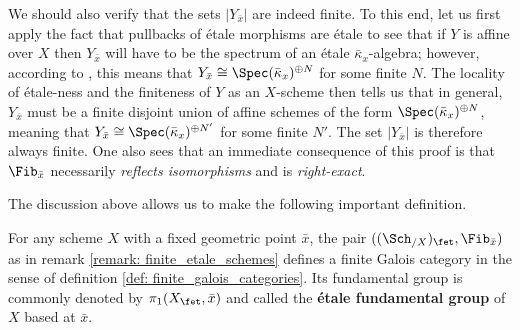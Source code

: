 \begin{remark}
                We should also verify that the sets $|Y_{\bar{x}}|$ are indeed finite. To this end, let us first apply the fact that pullbacks of \'etale morphisms are \'etale to see that if $Y$ is affine over $X$ then $Y_{\bar{x}}$ will have to be the spectrum of an \'etale $\bar{\kappa}_x$-algebra; however, according to \cite[\href{https://stacks.math.columbia.edu/tag/00U3}{Tag 00U3}]{stacks}, this means that $Y_{\bar{x}} \cong \Spec (\bar{\kappa}_x)^{\oplus N}$ for some finite $N$. The locality of \'etale-ness and the finiteness of $Y$ as an $X$-scheme then tells us that in general, $Y_{\bar{x}}$ must be a finite disjoint union of affine schemes of the form $\Spec (\bar{\kappa}_x)^{\oplus N}$, meaning that $Y_{\bar{x}} \cong \Spec (\bar{\kappa}_x)^{\oplus N'}$ for some finite $N'$. The set $|Y_{\bar{x}}|$ is therefore always finite. One also sees that an immediate consequence of this proof is that $\Fib_{\bar{x}}$ necessarily \textit{reflects isomorphisms} and is \textit{right-exact}. 
            \end{remark}
            
            The discussion above allows us to make the following important definition.
            \begin{definition} \label{def: etale_fundamental_groups_of_schemes}
                For any scheme $X$ with a fixed geometric point $\bar{x}$, the pair $((\Sch_{/X})_{\fet}, \Fib_{\bar{x}})$ as in remark \ref{remark: finite_etale_schemes} defines a finite Galois category in the sense of definition \ref{def: finite_galois_categories}. Its fundamental group is commonly denoted by $\pi_1(X_{\fet}, \bar{x})$ and called the \textbf{\'etale fundamental group} of $X$ based at $\bar{x}$.
            \end{definition}
            
